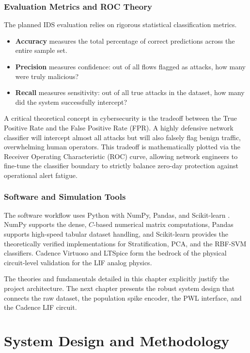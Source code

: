 \documentclass{ieeeaccess}
\begin{document}
\subsection{Evaluation Metrics and ROC Theory}

The planned IDS evaluation relies on rigorous statistical classification metrics. 
\begin{itemize}
\item \textbf{Accuracy} measures the total percentage of correct predictions across the entire sample set.
\item \textbf{Precision} measures confidence: out of all flows flagged as attacks, how many were truly malicious?
\item \textbf{Recall} measures sensitivity: out of all true attacks in the dataset, how many did the system successfully intercept?
\end{itemize}

A critical theoretical concept in cybersecurity is the tradeoff between the True Positive Rate and the False Positive Rate (FPR). A highly defensive network classifier will intercept almost all attacks but will also falsely flag benign traffic, overwhelming human operators. This tradeoff is mathematically plotted via the Receiver Operating Characteristic (ROC) curve, allowing network engineers to fine-tune the classifier boundary to strictly balance zero-day protection against operational alert fatigue.

\subsection{Software and Simulation Tools}

The software workflow uses Python with NumPy, Pandas, and Scikit-learn \cite{Pedregosa2011}. NumPy supports the dense, $C$-based numerical matrix computations, Pandas supports high-speed tabular dataset handling, and Scikit-learn provides the theoretically verified implementations for Stratification, PCA, and the RBF-SVM classifiers. Cadence Virtuoso and LTSpice form the bedrock of the physical circuit-level validation for the LIF analog physics.

The theories and fundamentals detailed in this chapter explicitly justify the project architecture. The next chapter presents the robust system design that connects the raw dataset, the population spike encoder, the PWL interface, and the Cadence LIF circuit.


\chapter{System Design and Methodology}
\end{document}

